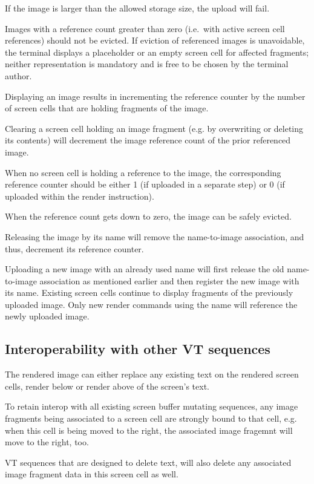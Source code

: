 \documentclass[a4paper]{article}
\begin{document}
If the image is larger than the allowed storage size, the upload will fail.

Images with a reference count greater than zero (i.e.\ with active screen cell references)
should not be evicted. If eviction of referenced images is unavoidable,
the terminal displays a placeholder or an empty screen cell for affected fragments;
neither representation is mandatory and is free to be chosen by the terminal author.

Displaying an image results in incrementing the reference counter
by the number of screen cells that are holding fragments of the image.

Clearing a screen cell holding an image fragment (e.g. by overwriting
or deleting its contents) will decrement the image reference count of
the prior referenced image.

When no screen cell is holding a reference to the image,
the corresponding reference counter should be either 1 (if uploaded in a separate step)
or 0 (if uploaded within the render instruction).

When the reference count gets down to zero, the image can be safely evicted.

Releasing the image by its name will remove the name-to-image association, and thus,
decrement its reference counter.

Uploading a new image with an already used name will first release the old name-to-image association
as mentioned earlier and then register the new image with its name.
Existing screen cells continue to display fragments of the previously uploaded image.
Only new render commands using the name will reference the newly uploaded image.

\subsection{Interoperability with other VT sequences} %

The rendered image can either replace any existing text on the rendered
screen cells, render below or render above of the screen's text.

To retain interop with all existing screen buffer mutating sequences,
any image fragments being associated to a screen cell are strongly bound
to that cell, e.g. when this cell is being moved to the right, the associated
image fragemnt will move to the right, too.

VT sequences that are designed to delete text, will also delete any
associated image fragment data in this screen cell as well.
\end{document}
